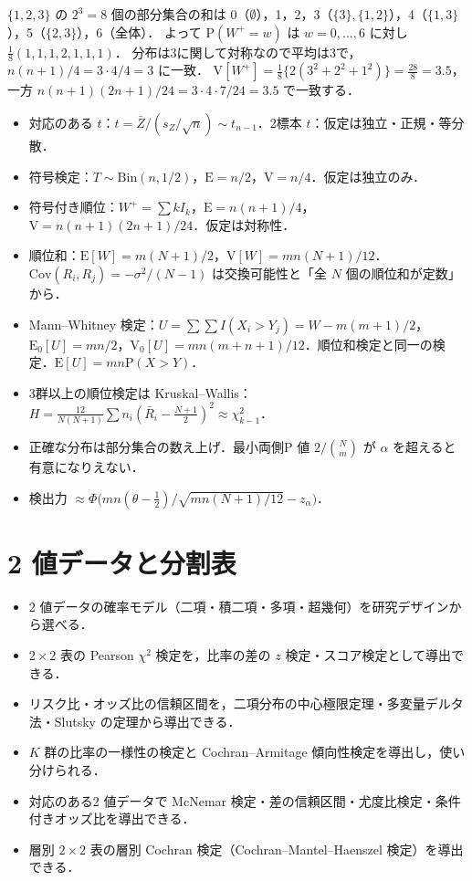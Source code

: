 \documentclass[a4paper,11pt,openany]{ltjsbook}
\newenvironment{kaitou}[1]{%
  \par\medskip\noindent
  \begin{tcolorbox}[enhanced,breakable,colback=bkgray!3,colframe=bkgray!60,boxrule=0.4pt,
    left=4pt,right=4pt,top=2pt,bottom=2pt,arc=1pt,
    title={\cref{#1}の解答},fonttitle=\bfseries\small,coltitle=white,colbacktitle=bkgray!80]}%
  {\end{tcolorbox}\par}
\newcommand{\E}{\mathrm{E}}
\newcommand{\V}{\mathrm{V}}
\newcommand{\Cov}{\mathrm{Cov}}
\newcommand{\Prob}{\mathrm{P}}
\newcommand{\Bin}{\mathrm{Bin}}
\begin{document}
\begin{kaitou}{reidai:03-4}
$\{1,2,3\}$ の $2^3=8$ 個の部分集合の和は
0（$\emptyset$），1，2，3（$\{3\},\{1,2\}$），4（$\{1,3\}$），5（$\{2,3\}$），6（全体）．
よって $\Prob(W^+=w)$ は $w=0,\dots,6$ に対し $\frac18(1,1,1,2,1,1,1)$．
分布は3に関して対称なので平均は3で，$n(n+1)/4=3\cdot4/4=3$ に一致．
$\V[W^+]=\frac18\{2(3^2+2^2+1^2)\}=\frac{28}{8}=3.5$，
一方 $n(n+1)(2n+1)/24=3\cdot4\cdot7/24=3.5$ で一致する．
\end{kaitou}

\enlargethispage{3\baselineskip}
\begin{summarybox}
\begin{itemize}
\item 対応のある $t$：$t=\bar Z/(s_Z/\sqrt n)\sim t_{n-1}$．2標本 $t$：仮定は独立・正規・等分散．
\item 符号検定：$T\sim\Bin(n,1/2)$，$\E=n/2$，$\V=n/4$．仮定は独立のみ．
\item 符号付き順位：$W^+=\sum kI_k$，$\E=n(n+1)/4$，$\V=n(n+1)(2n+1)/24$．仮定は対称性．
\item 順位和：$\E[W]=m(N+1)/2$，$\V[W]=mn(N+1)/12$．$\Cov(R_i,R_j)=-\sigma^2/(N-1)$ は交換可能性と「全 $N$ 個の順位和が定数」から．
\item Mann--Whitney 検定：$U=\sum\sum I(X_i>Y_j)=W-m(m+1)/2$，$\E_0[U]=mn/2$，$\V_0[U]=mn(m+n+1)/12$．順位和検定と同一の検定．$\E[U]=mn\Prob(X>Y)$．
\item 3群以上の順位検定は Kruskal--Wallis：$H=\frac{12}{N(N+1)}\sum n_i(\bar R_i-\frac{N+1}2)^2\approx\chi^2_{k-1}$．
\item 正確な分布は部分集合の数え上げ．最小両側P 値 $2/\binom Nm$ が $\alpha$ を超えると有意になりえない．
\item 検出力 $\approx\Phi\bigl(mn(\theta-\frac12)/\sqrt{mn(N+1)/12}-z_\alpha\bigr)$．
\end{itemize}
\end{summarybox}

\chapter{2 値データと分割表}\label{ch:04}

\begin{goalbox}
\begin{itemize}
\item 2 値データの確率モデル（二項・積二項・多項・超幾何）を研究デザインから選べる．
\item $2\times2$ 表の Pearson $\chi^2$ 検定を，比率の差の $z$ 検定・スコア検定として導出できる．
\item リスク比・オッズ比の信頼区間を，二項分布の中心極限定理・多変量デルタ法・Slutsky の定理から導出できる．
\item $K$ 群の比率の一様性の検定と Cochran--Armitage 傾向性検定を導出し，使い分けられる．
\item 対応のある2 値データで McNemar 検定・差の信頼区間・尤度比検定・条件付きオッズ比を導出できる．
\item 層別 $2\times2$ 表の層別 Cochran 検定（Cochran--Mantel--Haenszel 検定）を導出できる．
\end{itemize}
\end{goalbox}
\end{document}
